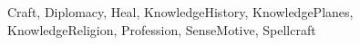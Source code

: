 \def\OracleBAB{a}
\def\OracleFort{p}
\def\OracleRef{p}
\def\OracleWill{g}
\edef\OracleClassSkillsList{}{\forcsvlist\listadd{\OracleClassSkillsList}}{Craft, Diplomacy, Heal, KnowledgeHistory, KnowledgePlanes, KnowledgeReligion, Profession, SenseMotive, Spellcraft}
